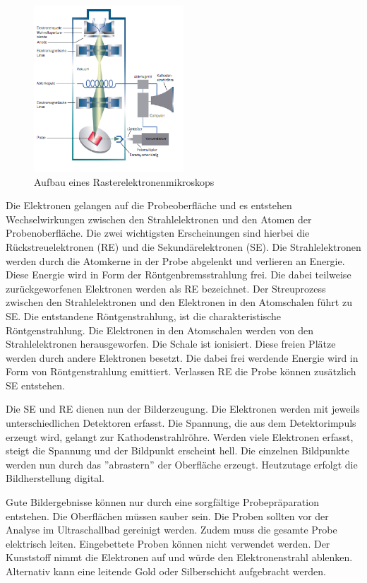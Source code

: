\documentclass[a4paper, 11pt]{tubsreprt}
\begin{document}
\begin{figure} %
\centering
\includegraphics[width=0.5\textwidth]{Bilder/REM.png}
\caption[Aufbau eines Rasterelektronenmikroskops]{Aufbau eines Rasterelektronenmikroskops \cite{Welsch2015}}
\label{REM Aufbau}
\end{figure}


Die Elektronen gelangen auf die Probeoberfläche und es entstehen Wechselwirkungen zwischen den Strahlelektronen und den Atomen der Probenoberfläche. Die zwei wichtigsten Erscheinungen sind hierbei die Rückstreuelektronen (RE) und die Sekundärelektronen (SE). Die Strahlelektronen werden durch die Atomkerne in der Probe abgelenkt und verlieren an Energie. Diese Energie wird in Form der Röntgenbremsstrahlung frei. Die dabei teilweise zurückgeworfenen Elektronen werden als RE bezeichnet. Der Streuprozess zwischen den Strahlelektronen und den Elektronen in den Atomschalen führt zu SE. Die entstandene Röntgenstrahlung, ist die charakteristische Röntgenstrahlung. Die Elektronen in den Atomschalen werden von den Strahlelektronen herausgeworfen. Die Schale ist ionisiert. Diese freien Plätze werden durch andere Elektronen besetzt. Die dabei frei werdende Energie wird in Form von Röntgenstrahlung emittiert. Verlassen RE die Probe können zusätzlich SE entstehen.

Die SE und RE dienen nun der Bilderzeugung. Die Elektronen werden mit jeweils unterschiedlichen Detektoren erfasst. Die Spannung, die aus dem Detektorimpuls erzeugt wird, gelangt zur Kathodenstrahlröhre. Werden viele Elektronen erfasst, steigt die Spannung und der Bildpunkt erscheint hell. Die einzelnen Bildpunkte werden nun durch das ''abrastern'' der Oberfläche erzeugt. Heutzutage erfolgt die Bildherstellung digital\cite{Welsch2015}.

Gute Bildergebnisse können nur durch eine sorgfältige Probepräparation entstehen. Die Oberflächen müssen sauber sein. Die Proben sollten vor der Analyse im Ultraschallbad gereinigt werden.  Zudem muss die gesamte Probe elektrisch leiten. Eingebettete Proben können nicht verwendet werden. Der Kunststoff nimmt die Elektronen auf und würde den Elektronenstrahl ablenken. Alternativ kann eine leitende Gold oder Silberschicht aufgebracht werden.   
\end{document}
